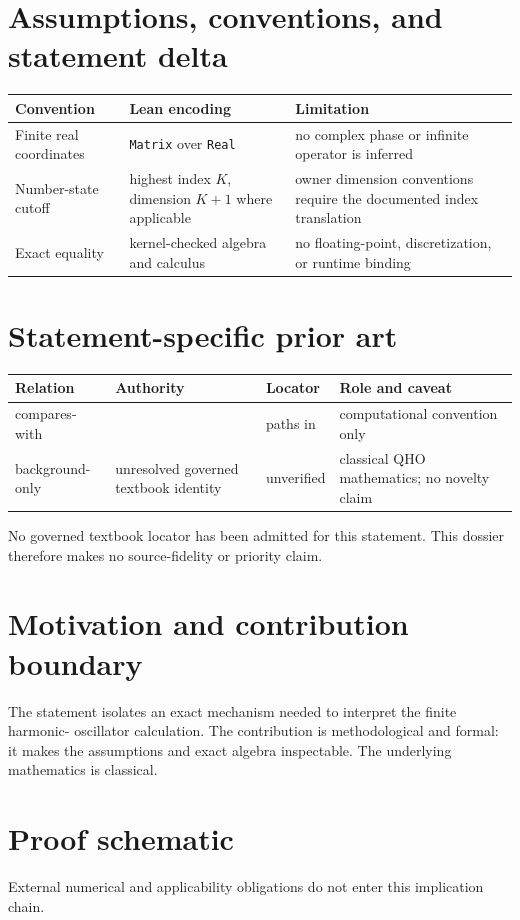 \documentclass[11pt]{article}
\begin{document}
\section{Assumptions, conventions, and statement delta}
\begin{tabularx}{\textwidth}{@{}YYY@{}}\toprule
Convention & Lean encoding & Limitation \\
\midrule
Finite real coordinates & \texttt{Matrix} over \texttt{Real} & no complex phase or infinite operator is inferred \\
Number-state cutoff & highest index $K$, dimension $K+1$ where applicable & owner dimension conventions require the documented index translation \\
Exact equality & kernel-checked algebra and calculus & no floating-point, discretization, or runtime binding \\
\bottomrule\end{tabularx}

\section{Statement-specific prior art}
\begin{tabularx}{\textwidth}{@{}lYYY@{}}\toprule
Relation & Authority & Locator & Role and caveat \\
\midrule
compares-with &  & paths in  & computational convention only \\
background-only & unresolved governed textbook identity & unverified & classical QHO mathematics; no novelty claim \\
\bottomrule\end{tabularx}
No governed textbook locator has been admitted for this statement. This dossier therefore
makes no source-fidelity or priority claim.

\section{Motivation and contribution boundary}
The statement isolates an exact mechanism needed to interpret the finite harmonic-
oscillator calculation. The contribution is methodological and formal: it makes the
assumptions and exact algebra inspectable. The underlying mathematics is classical.

\section{Proof schematic}
\begin{center}\end{center}
External numerical and applicability obligations do not enter this implication chain.
\end{document}
